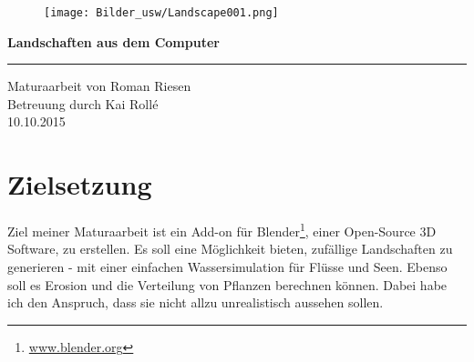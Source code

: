 \documentclass[12pt,twoside]{book}
\begin{document}
\frontmatter
{}

{

\begin{titlepage}

\begin{figure}[H]
\centering
\texttt{[image: Bilder\_usw/Landscape001.png]}
\captionsetup{labelformat=empty}
\caption[Ein Modell einer einfachen Landschaft mit Wireframe-Modifier]{}
\end{figure}

\begin{flushright}
{ \huge \bfseries \vspace*{0cm} \noindent Landschaften aus dem Computer\\[1.0cm] }

\rule{11cm}{1.5pt}

\vspace*{1cm}
\Large
\noindent
Maturaarbeit von Roman Riesen\\ Betreuung durch Kai Rollé \\10.10.2015\\
\vspace{0.5cm}


\end{flushright}
\end{titlepage}
}


\setcounter{page}{0}
\newpage
\newpage
\tableofcontents

\listoffigures


\mainmatter

\chapter{Zielsetzung}
Ziel meiner Maturaarbeit ist ein Add-on f\"ur Blender\footnote{\url{www.blender.org}}, einer Open-Source 3D Software, zu erstellen. Es soll eine M\"oglichkeit bieten, zuf\"allige Landschaften zu generieren - mit einer einfachen Wassersimulation f\"ur Fl\"usse und Seen. Ebenso soll es Erosion und die Verteilung von Pflanzen berechnen k\"onnen.
Dabei habe ich den Anspruch, dass sie nicht allzu unrealistisch aussehen sollen.
\end{document}
